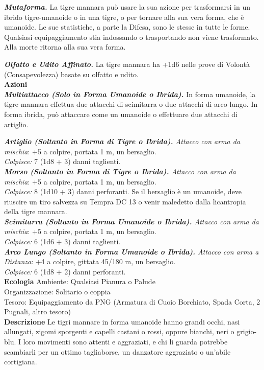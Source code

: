 \begin{multicols}{2}
\emph{\textbf{Mutaforma.}} La tigre mannara può usare la sua azione per trasformarsi in un ibrido tigre-umanoide o in una tigre, o per tornare alla sua vera forma, che è umanoide. Le sue statistiche, a parte la Difesa, sono le stesse in tutte le forme. Qualsiasi equipaggiamento stia indossando o trasportando non viene trasformato. Alla morte ritorna alla sua vera forma.

\emph{\textbf{Olfatto e Udito Affinato.}} La tigre mannara ha +1d6 nelle prove di Volontà (Consapevolezza) basate su olfatto e udito.\\

\smallskip\textbf{Azioni}\\

\emph{\textbf{Multiattacco (Solo in Forma Umanoide o Ibrida).}} In forma umanoide, la tigre mannara effettua due attacchi di scimitarra o due attacchi di arco lungo. In forma ibrida, può attaccare come un umanoide o effettuare due attacchi di artiglio.

\emph{\textbf{Artiglio (Soltanto in Forma di Tigre o Ibrida).} Attacco con arma da mischia}: +5 a colpire, portata 1 m, un bersaglio.\\
\emph{Colpisce:} 7 (1d8 + 3) danni taglienti.\\

\emph{\textbf{Morso (Soltanto in Forma di Tigre o Ibrida).} Attacco con arma da mischia}: +5 a colpire, portata 1 m, un bersaglio.\\
\emph{Colpisce:} 8 (1d10 + 3) danni perforanti. Se il bersaglio è un umanoide, deve riuscire un tiro salvezza su Tempra DC 13 o venir maledetto dalla licantropia della tigre mannara.\\

\emph{\textbf{Scimitarra (Soltanto in Forma Umanoide o Ibrida).} Attacco con arma da mischia}: +5 a colpire, portata 1 m, un bersaglio.\\
\emph{Colpisce:} 6 (1d6 + 3) danni taglienti.\\

\emph{\textbf{Arco Lungo (Soltanto in Forma Umanoide o Ibrida).} Attacco con arma a Distanza}: +4 a colpire, gittata 45/180 m, un bersaglio.\\

\emph{Colpisce:} 6 (1d8 + 2) danni perforanti.\\
\textbf{Ecologia}
Ambiente: Qualsiasi Pianura o Palude\\
Organizzazione: Solitario o coppia\\
Tesoro: Equipaggiamento da PNG (Armatura di Cuoio Borchiato, Spada Corta, 2 Pugnali, altro tesoro)\\
\textbf{Descrizione}
Le tigri mannare in forma umanoide hanno grandi occhi, nasi allungati, zigomi sporgenti e capelli castani o rossi, oppure bianchi, neri o grigio-blu. I loro movimenti sono attenti e aggraziati, e chi li guarda potrebbe scambiarli per un ottimo tagliaborse, un danzatore aggraziato o un’abile cortigiana.\\


\end{multicols}

